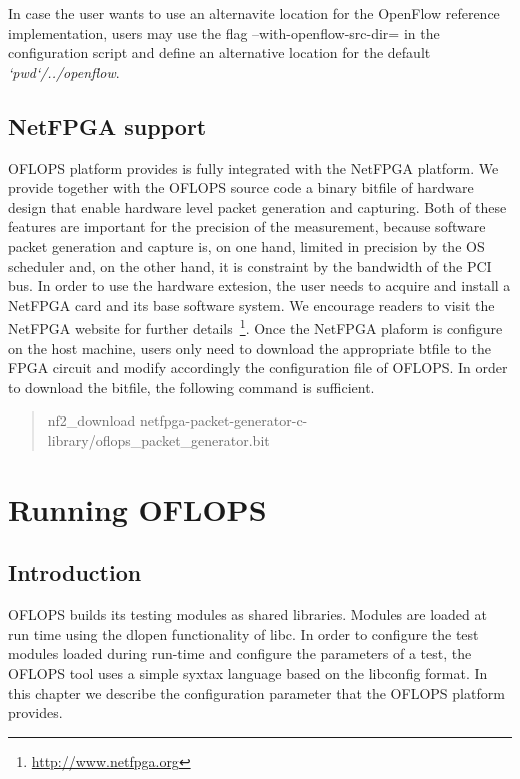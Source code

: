\documentclass{book}
\begin{document}
In case the user wants to use an alternavite location for the OpenFlow reference
implementation, users may use the flag --with-openflow-src-dir= in the
configuration script and define an alternative location for the default
\emph{`pwd`/../openflow}. 

\section{NetFPGA support}

OFLOPS platform provides is fully integrated with the NetFPGA platform.
We provide together with the OFLOPS source code a binary bitfile of hardware
design that enable hardware level packet generation and capturing. 
Both of these features are
important for the precision of the measurement, because software packet generation 
and capture is, on one hand, limited in 
precision by the OS scheduler and, on the other hand, it is constraint by the 
bandwidth of the PCI bus. In order to use the hardware extesion, the
user needs to acquire and install a NetFPGA card and its base software system.
We encourage readers to visit the NetFPGA website for further
details~\footnote{\url{http://www.netfpga.org}}. Once the NetFPGA plaform is
configure on the host machine, users only need to download the appropriate btfile to the FPGA
circuit and modify accordingly the configuration file of OFLOPS. In order to
download the bitfile, the following command is sufficient. 

\begin{quote}
nf2\_download netfpga-packet-generator-c-library/oflops\_packet\_generator.bit
\end{quote}

\chapter{Running OFLOPS}

\section{Introduction}

OFLOPS builds its testing modules as shared libraries. Modules are 
loaded at run time using the dlopen functionality of libc. In order to
configure the test modules loaded during run-time and configure the
parameters of a test, the OFLOPS tool uses a simple syxtax language based on
the libconfig format. In this chapter we describe the configuration parameter
that the OFLOPS platform provides.
\end{document}
